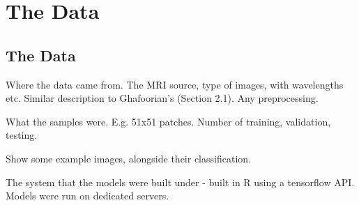 %
%

\chapter{The Data}\label{model}

\section{The Data}

Where the data came from. The MRI source, type of images, with wavelengths etc. Similar description to Ghafoorian's (Section 2.1). Any preprocessing.

What the samples were. E.g. 51x51 patches. Number of training, validation, testing.

Show some example images, alongside their classification.

The system that the models were built under - built in R using a tensorflow API. Models were run on dedicated servers.

%
%
%
%
%
%
%
%
%




%
